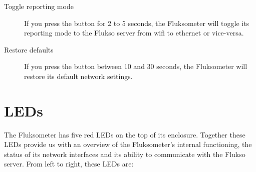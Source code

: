 \begin{description}

\item[Toggle reporting mode] If you press the button for 2 to 5 seconds, the Fluksometer will toggle its reporting mode to the Flukso server from wifi to ethernet or vice-versa.
\item[Restore defaults] If you press the button between 10 and 30 seconds, the Fluksometer will restore its default network settings.

\end{description}


\section{LEDs}
The Fluksometer has five red LEDs on the top of its enclosure. Together these LEDs provide us with an overview of the Fluksometer's internal functioning, the status of its network interfaces and its ability to communicate with the Flukso server. From left to right, these LEDs are:


